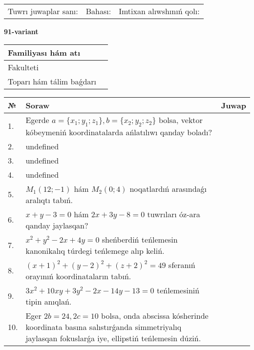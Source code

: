 \documentclass{article}
\begin{document}
\vspace{0.7cm}

\begin{tabular}{lll}
Tuwrı juwaplar sanı: \underline{\hspace{1cm}} & 
Bahası: \underline{\hspace{1cm}} & 
Imtixan alıwshınıń qolı: \underline{\hspace{2cm}} \\
\end{tabular}

\egroup

\newpage


\textbf{91-variant}\\

\bgroup
\def\arraystretch{1.6} %

\begin{tabular}{|m{5.7cm}|m{9.5cm}|}
\hline
Familiyası hám atı & \\
\hline
Fakulteti  & \\
\hline
Toparı hám tálim baǵdarı  & \\
\hline
\end{tabular}

\vspace{0.7cm}

\begin{tabular}{|m{0.7cm}|m{10cm}|m{4cm}|}
\hline
№ & Soraw & Juwap \\
\hline
1. & Egerde \(a = \{ x_{1}; y_{1}; z_{1}\}, b = \{ x_{2}; y_{2}; z_{2}\}\) bolsa, vektor kóbeymeniń koordinatalarda ańlatılıwı qanday boladı? &  \\
\hline
2. & undefined &  \\
\hline
3. & undefined &  \\
\hline
4. & undefined &  \\
\hline
5. & \(M_{1} (12; - 1)\) hám \(M_{2} (0;4)\) noqatlardıń arasındaǵı aralıqtı tabıń. &  \\
\hline
6. & \(x + y - 3 = 0\) hám \(2 x + 3 y - 8 = 0\) tuwrıları óz-ara qanday jaylasqan? &  \\
\hline
7. & \(x^{2} + y^{2} - 2 x + 4 y = 0\) sheńberdiń teńlemesin kanonikalıq túrdegi teńlemege alıp keliń. &  \\
\hline
8. & \((x + 1) ^{2} + (y - 2) ^{2} + (z + 2) ^{2} = 49\) sferanıń orayınıń koordinataların tabıń. &  \\
\hline
9. & \(3 x^{2} + 10 xy + 3 y^{2} - 2 x - 14 y - 13 = 0\) teńlemesiniń tipin anıqlań. &  \\
\hline
10. & Eger \(2 b = 24, 2 c = 10\) bolsa, onda abscissa kósherinde koordinata basına salıstırǵanda simmetriyalıq jaylasqan fokuslarǵa iye, ellipstiń teńlemesin dúziń. & \\
\hline
\end{tabular}
\end{document}
